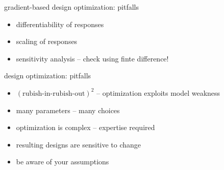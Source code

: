 \documentclass[aspectratio=169]{beamer}
\begin{document}
\begin{frame}{gradient-based design optimization: pitfalls}


\centering
\begin{minipage}[c]{.7\textwidth}
\begin{itemize}[itemsep=1.5em]
\pause
\item[\checkmark] differentiability of responses
\pause
\item[\checkmark] scaling of responses
\pause
\item[\checkmark] sensitivity analysis -- check using finte difference!
\end{itemize}
\end{minipage}
\end{frame}

\begin{frame}{design optimization: pitfalls}


\centering
\begin{minipage}[c]{.7\textwidth}
\begin{itemize}[itemsep=1.5em]
\pause
\item[\checkmark] $(\text{rubish-in-rubish-out})^2$ -- optimization exploits model weakness
\pause
\item[\checkmark] many parameters -- many choices
\pause
\item[\checkmark] optimization is complex -- expertise required
\pause
\item[\checkmark] resulting designs are sensitive to change
\pause
\item[\checkmark] be aware of your assumptions
\end{itemize}
\end{minipage}
\end{frame}
\end{document}

